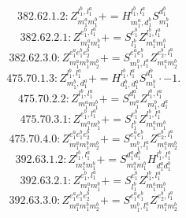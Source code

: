 \documentclass[letterpaper,10pt,fleqn,leqno,onecolumn]{article}
\begin{document}
\begin{equation} \;\;\;\;\;\;  382.62.1.2: Z^{l_{1}^{b},l_{1}^{a}}_{m_{1}^{a}m_{1}^{b}}+=H^{l_{1}^{b},l_{1}^{a}}_{m_{1}^{a},d_{1}^{b}}S^{d_{1}^{b}}_{m_{1}^{b}} \end{equation}
\begin{equation} \;\;\;\;\;\;  382.62.2.1: Z^{e_{1}^{b},l_{1}^{a}}_{m_{1}^{a}m_{1}^{b}}+=S^{e_{1}^{b}}_{l_{1}^{b}}Z^{l_{1}^{b},l_{1}^{a}}_{m_{1}^{a}m_{1}^{b}} \end{equation}
\begin{equation} \;\;\;\;\;\;  382.62.3.0: Z^{e_{1}^{a}e_{1}^{b}e_{2}^{b}}_{m_{1}^{a}m_{1}^{b}m_{2}^{b}}+=S^{e_{1}^{a}e_{1}^{b}}_{m_{1}^{b},l_{1}^{a}}Z^{e_{2}^{b},l_{1}^{a}}_{m_{1}^{a}m_{2}^{b}} \end{equation}
\begin{equation} \;\;\;\;\;\;  475.70.1.3: Z^{l_{1}^{b},l_{1}^{a}}_{m_{1}^{b},d_{1}^{a}}+=H^{l_{1}^{b},l_{1}^{a}}_{d_{1}^{b},d_{1}^{a}}S^{d_{1}^{b}}_{m_{1}^{b}}\cdot -1. \end{equation}
\begin{equation} \;\;\;\;\;\;  475.70.2.2: Z^{l_{1}^{b},l_{1}^{a}}_{m_{1}^{a}m_{1}^{b}}+=S^{d_{1}^{a}}_{m_{1}^{a}}Z^{l_{1}^{b},l_{1}^{a}}_{m_{1}^{b},d_{1}^{a}} \end{equation}
\begin{equation} \;\;\;\;\;\;  475.70.3.1: Z^{e_{1}^{b},l_{1}^{a}}_{m_{1}^{a}m_{1}^{b}}+=S^{e_{1}^{b}}_{l_{1}^{b}}Z^{l_{1}^{b},l_{1}^{a}}_{m_{1}^{a}m_{1}^{b}} \end{equation}
\begin{equation} \;\;\;\;\;\;  475.70.4.0: Z^{e_{1}^{a}e_{1}^{b}e_{2}^{b}}_{m_{1}^{a}m_{1}^{b}m_{2}^{b}}+=S^{e_{1}^{a}e_{1}^{b}}_{m_{1}^{b},l_{1}^{a}}Z^{e_{2}^{b},l_{1}^{a}}_{m_{1}^{a}m_{2}^{b}} \end{equation}
\begin{equation} \;\;\;\;\;\;  392.63.1.2: Z^{l_{1}^{b},l_{1}^{a}}_{m_{1}^{a}m_{1}^{b}}+=S^{d_{1}^{a}d_{1}^{b}}_{m_{1}^{a}m_{1}^{b}}H^{l_{1}^{b},l_{1}^{a}}_{d_{1}^{a}d_{1}^{b}} \end{equation}
\begin{equation} \;\;\;\;\;\;  392.63.2.1: Z^{e_{1}^{b},l_{1}^{a}}_{m_{1}^{a}m_{1}^{b}}+=S^{e_{1}^{b}}_{l_{1}^{b}}Z^{l_{1}^{b},l_{1}^{a}}_{m_{1}^{a}m_{1}^{b}} \end{equation}
\begin{equation} \;\;\;\;\;\;  392.63.3.0: Z^{e_{1}^{a}e_{1}^{b}e_{2}^{b}}_{m_{1}^{a}m_{1}^{b}m_{2}^{b}}+=S^{e_{1}^{a}e_{1}^{b}}_{m_{1}^{b},l_{1}^{a}}Z^{e_{2}^{b},l_{1}^{a}}_{m_{1}^{a}m_{2}^{b}} \end{equation}
\end{document}
